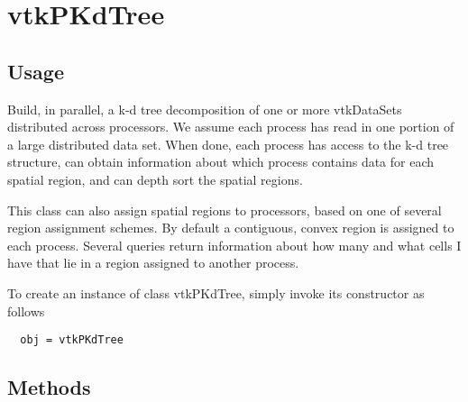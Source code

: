 \section{vtkPKdTree}

\subsection{Usage}

      Build, in parallel, a k-d tree decomposition of one or more
      vtkDataSets distributed across processors.  We assume each
      process has read in one portion of a large distributed data set.
      When done, each process has access to the k-d tree structure, 
      can obtain information about which process contains 
      data for each spatial region, and can depth sort the spatial
      regions.

      This class can also assign spatial regions to processors, based
      on one of several region assignment schemes.  By default 
      a contiguous, convex region is assigned to each process.  Several
      queries return information about how many and what cells I have
      that lie in a region assigned to another process.


To create an instance of class vtkPKdTree, simply
invoke its constructor as follows
\begin{verbatim}
  obj = vtkPKdTree
\end{verbatim}
\subsection{Methods}

